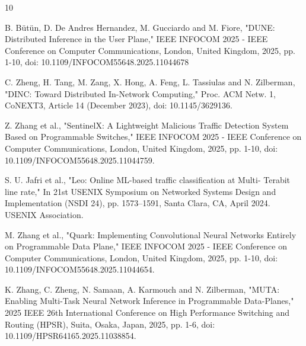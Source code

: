 \documentclass[onecolumn,letter,10pt]{article}
\begin{document}
\begin{thebibliography}{10}


B. Bütün, D. De Andres Hernandez, M. Gucciardo and M. Fiore, "DUNE: Distributed Inference in the User Plane," IEEE INFOCOM 2025 - IEEE Conference on Computer Communications, London, United Kingdom, 2025, pp. 1-10, doi: 10.1109/INFOCOM55648.2025.11044678

C. Zheng, H. Tang, M. Zang, X. Hong, A. Feng, L. Tassiulas and N. Zilberman, "DINC: Toward Distributed In-Network Computing," Proc. ACM Netw. 1, CoNEXT3, Article 14 (December 2023), doi: 10.1145/3629136.

Z. Zhang et al., "SentinelX: A Lightweight Malicious Traffic Detection System Based on Programmable Switches," IEEE INFOCOM 2025 - IEEE Conference on Computer Communications, London, United Kingdom, 2025, pp. 1-10, doi: 10.1109/INFOCOM55648.2025.11044759.

S. U. Jafri et al., "Leo: Online ML-based traffic classification at Multi-
Terabit line rate," In 21st USENIX Symposium on Networked Systems
Design and Implementation (NSDI 24), pp. 1573–1591, Santa Clara,
CA, April 2024. USENIX Association.

M. Zhang et al., "Quark: Implementing Convolutional Neural Networks Entirely on Programmable Data Plane," IEEE INFOCOM 2025 - IEEE Conference on Computer Communications, London, United Kingdom, 2025, pp. 1-10, doi: 10.1109/INFOCOM55648.2025.11044654.

K. Zhang, C. Zheng, N. Samaan, A. Karmouch and N. Zilberman, "MUTA: Enabling Multi-Task Neural Network Inference in Programmable Data-Planes," 2025 IEEE 26th International Conference on High Performance Switching and Routing (HPSR), Suita, Osaka, Japan, 2025, pp. 1-6, doi: 10.1109/HPSR64165.2025.11038854.

\end{thebibliography}
\end{document}
